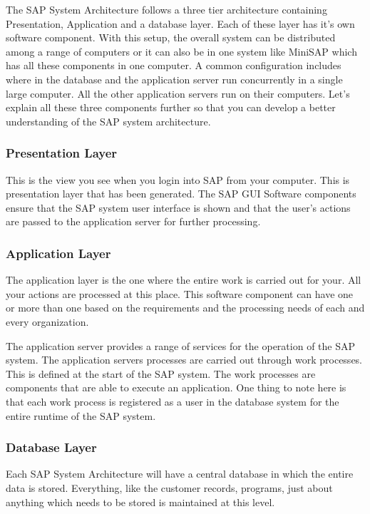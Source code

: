     The SAP System Architecture follows a three tier architecture containing Presentation, Application and a database layer. Each of these layer  has it’s own software component. With this setup, the overall system can be distributed among a range of computers or it can also be in one system like MiniSAP which has all these components in one computer. A common configuration includes where in the database and the application server run concurrently in a single large computer. All the other application servers run on their computers. Let’s explain all these three components further so that you can develop a better understanding of the SAP system architecture.
    
    \subsubsection{Presentation Layer}
    This is the view you see when you login into SAP from your computer. This is presentation layer that has been generated. The SAP GUI Software components ensure that the SAP system user interface is shown and that the user’s actions are passed to the application server for further processing.

    \subsubsection{Application Layer}
    The application layer is the one where the entire work is carried out for your. All your actions are processed at this place. This software component can have one or more than one based on the requirements and the processing needs of each and every organization.

    The application server provides a range of services for the operation of the SAP system. The application servers processes are carried out through work processes. This is defined at the start of the SAP system. The work processes are components that are able to execute an application. One thing to note here is that each work process is registered as a user in the database system for the entire runtime of the SAP system.

    \subsubsection{Database Layer}
    Each SAP System Architecture will have a central database in which the entire data is stored. Everything, like the customer records, programs, just about anything which needs to be stored is maintained at this level.

